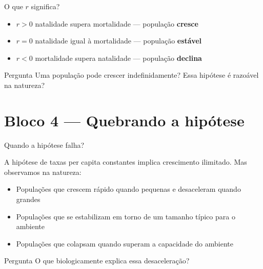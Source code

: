 \documentclass[12pt]{beamer}
\begin{document}
\begin{frame}{O que $r$ significa?}

  \begin{itemize}
    \item $r > 0$ \quad natalidade supera mortalidade
      --- população \textbf{cresce}
    \bigskip
    \item $r = 0$ \quad natalidade igual à mortalidade
      --- população \textbf{estável}
    \bigskip
    \item $r < 0$ \quad mortalidade supera natalidade
      --- população \textbf{declina}
  \end{itemize}

  \bigskip
  \begin{alertblock}{Pergunta}
    Uma população pode crescer indefinidamente?
    Essa hipótese é razoável na natureza?
  \end{alertblock}

\end{frame}

\section{Bloco 4 — Quebrando a hipótese}

\begin{frame}{Quando a hipótese falha?}

  A hipótese de taxas per capita constantes implica
  crescimento ilimitado. Mas observamos na natureza:

  \bigskip
  \begin{itemize}
    \item Populações que crescem rápido quando pequenas
      e desaceleram quando grandes
    \item Populações que se estabilizam em torno de
      um tamanho típico para o ambiente
    \item Populações que colapsam quando superam
      a capacidade do ambiente
  \end{itemize}

  \bigskip
  \begin{alertblock}{Pergunta}
    O que biologicamente explica essa desaceleração?
  \end{alertblock}

\end{frame}
\end{document}

